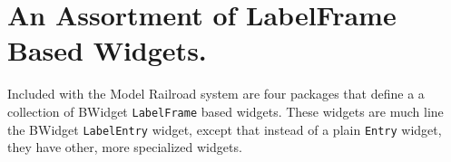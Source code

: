
\chapter{An Assortment of LabelFrame Based Widgets.}
\label{chapt:LabelFrameWidgets}

Included with the Model Railroad system are four packages that define a
a collection of BWidget \lstinline=LabelFrame= based widgets.  These
widgets are much line the BWidget \lstinline=LabelEntry= widget, except
that instead of a plain \lstinline=Entry= widget, they have other, more
specialized widgets.

